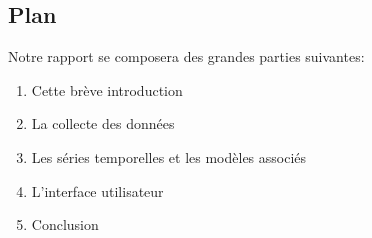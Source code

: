 \subsection{Plan}

Notre rapport se composera des grandes parties suivantes:

\begin{enumerate}[nolistsep]
    \item Cette brève introduction
    \item La collecte des données
    \item Les séries temporelles et les modèles associés
    \item L'interface utilisateur
    \item Conclusion
\end{enumerate}